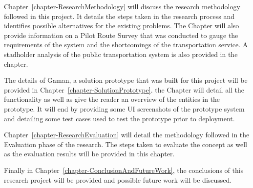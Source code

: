 Chapter~\ref{chapter-ResearchMethodology} will discuss the research methodology followed in this project. It details the steps taken in the research process and identifies possible alternatives for the existing problems. The Chapter will also provide information on a Pilot Route Survey that was conducted to gauge the requirements of the system and the shortcomings of the transportation service. A stadholder analysis of the public transportation system is also provided in the chapter.

The details of Gaman, a solution prototype that was built for this project will be provided in Chapter~\ref{chapter-SolutionPrototype}. the Chapter will detail all the functionality as well as give the reader an overview of the entities in the prototype. It will end by providing some UI screenshots of the prototype system and detailing some test cases used to test the prototype prior to deployment.

Chapter~\ref{chapter-ResearchEvaluation} will detail the methodology followed in the Evaluation phase of the research. The steps taken to evaluate the concept as well as the evaluation results will be provided in this chapter.

Finally in Chapter~\ref{chapter-ConclusionAndFutureWork}, the conclusions of this research project will be provided and possible future work will be discussed.


